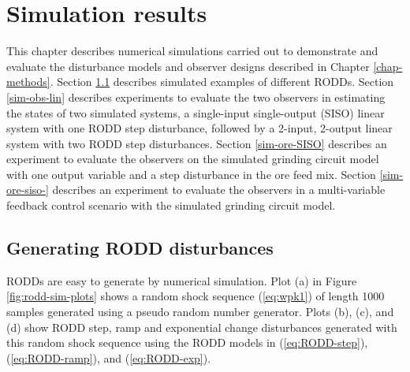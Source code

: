 \chapter{Simulation results}
\label{chap-simulation}

This chapter describes numerical simulations carried out to demonstrate and evaluate the disturbance models and observer designs described in Chapter \ref{chap-methods}. Section \ref{sim-RODDs} describes simulated examples of different RODDs. Section \ref{sim-obs-lin} describes experiments to evaluate the two observers in estimating the states of two simulated systems, a single-input single-output (SISO) linear system with one RODD step disturbance, followed by a 2-input, 2-output linear system with two RODD step disturbances. Section \ref{sim-ore-SISO} describes an experiment to evaluate the observers on the simulated grinding circuit model with one output variable and a step disturbance in the ore feed mix. Section \ref{sim-ore-siso-} describes an experiment to evaluate the observers in a multi-variable feedback control scenario with the simulated grinding circuit model.


\section{Generating RODD disturbances} \label{sim-RODDs}

RODDs are easy to generate by numerical simulation.  Plot (a) in Figure \ref{fig:rodd-sim-plots} shows a random shock sequence (\ref{eq:wpk1}) of length 1000 samples generated using a pseudo random number generator. Plots (b), (c), and (d) show RODD step, ramp and exponential change disturbances generated with this random shock sequence using the RODD models in (\ref{eq:RODD-step}), (\ref{eq:RODD-ramp}), and (\ref{eq:RODD-exp}). 

